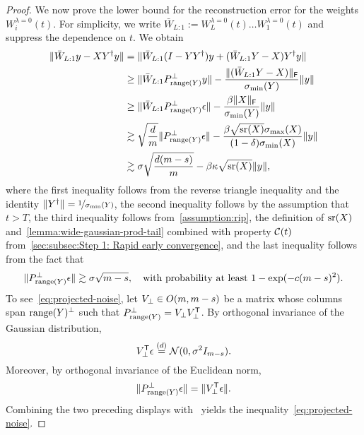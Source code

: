 \begin{proof}
    We now prove the lower bound for the reconstruction error for the weights $W_{i}^{\lambda = 0}(t)$. For simplicity, we write $\bar{W}_{L:1} := W_{L}^{\lambda = 0}(t) \dots W_{1}^{\lambda = 0}(t)$ and suppress the dependence on $t$. We obtain
    \begin{align}
        \lVert\bar W_{L:1}y-XY^{\dag}y\rVert &=
        \lVert\bar W_{L:1}(I-YY^{\dag})y+(\bar W_{L:1}Y-X)Y^{\dag} y\rVert \notag \\
        & \geq \lVert\bar W_{L:1}P_{\mathrm{range}(Y)}^{\perp}y\rVert- \frac{\lVert(\bar W_{L:1}Y-X)\rVert_{\mathsf{F}}} {\sigma_{\min}(Y)} \lVert y\rVert \notag \\
        & \geq \lVert\bar W_{L:1}P_{\mathrm{range}(Y)}^{\perp}\epsilon\rVert- \frac{\beta \lVert X\rVert_{\mathsf{F}}} {\sigma_{\min}(Y)} \lVert y\rVert \notag \\
        & \gtrsim  \sqrt{\frac{d}{m}} \lVert P_{\mathrm{range}(Y)}^{\perp} \epsilon\rVert- \frac{\beta \sqrt{\operatorname{\mathrm{sr}}(X)} \sigma_{\max}(X)} {(1  - \delta) \sigma_{\min}(X)} \lVert y\rVert \notag \\
        & \gtrsim \sigma \sqrt{\frac{d (m - s)}{m}}  - \beta \kappa \sqrt{\operatorname{\mathrm{sr}}(X)} \lVert y\rVert,
        \label{eq:test-error-lb-1}
    \end{align}
    where the first inequality follows from the reverse triangle inequality and the identity $\lVert Y^{\dag}\rVert = \nicefrac{1}{\sigma_{\min}(Y)}$,
    the second inequality follows by the assumption that $t > T$,
    the third inequality follows from~\cref{assumption:rip}, the definition of $\operatorname{\mathrm{sr}}(X)$ and~\cref{lemma:wide-gaussian-prod-tail} combined with property $\mathcal{C}(t)$ from~\cref{sec:subsec:Step 1: Rapid early convergence}, and the last inequality follows from the fact that
    \begin{equation}
        \label{eq:projected-noise}
        \lVert P_{\mathrm{range}(Y)}^{\perp} \epsilon\rVert
        \gtrsim \sigma \sqrt{m - s}, \quad
        \text{with probability at least $1 - \exp(-c(m - s)^2)$.}
    \end{equation}
    To see~\eqref{eq:projected-noise}, let $V_{\perp} \in O(m, m - s)$ be a matrix whose columns span $\mathrm{range}(Y)^{\perp}$
    such that $P_{\mathrm{range}(Y)}^{\perp} = V_{\perp} V_{\perp}^{\mathsf{T}}$.
    By orthogonal invariance of the Gaussian distribution,
    \[
        V_{\perp}^{\mathsf{T}} \epsilon \overset{(d)}{=}
        \mathcal{N}(0, \sigma^2 I_{m - s}).
    \]
    Moreover, by orthogonal invariance of the Euclidean norm,
    \[
        \lVert P_{\mathrm{range}(Y)}^{\perp} \epsilon\rVert =
        \lVert V_{\perp}^{\mathsf{T}} \epsilon\rVert.
    \]
    Combining the two preceding displays with~\citep[Theorem 3.1.1]{Ver18} yields the inequality~\eqref{eq:projected-noise}.


\end{proof}
